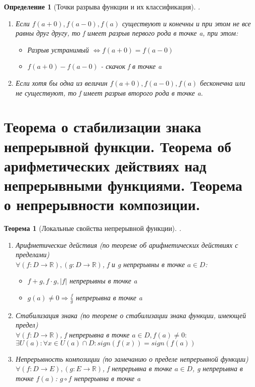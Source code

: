 \documentclass[11pt,a4paper,titlepage]{article}
\newtheorem*{theorem}{Теорема}
\newtheorem*{definition}{Определение}
\renewcommand{\implies}{\Rightarrow}
\renewcommand{\iff}{\Leftrightarrow}
\newcommand{\R}{\mathbb{R}}
\begin{document}
    \begin{definition}[Точки разрыва функции и их классификация]
        .\\
        \begin{enumerate}
            \item Если $f(a+0), f(a-0), f(a)$ существуют и конечны и при этом не все равны друг другу, то f имеет разрыв первого рода в точке a, при этом:
            \begin{itemize}
                \item Разрыв устранимый $\iff f(a+0) = f(a-0)$
                \item $f(a+0) - f(a-0)$ - скачок f в точке a
            \end{itemize}
            \item Если хотя бы одна из величин $f(a+0), f(a-0), f(a)$ бесконечна или не существуют, то f имеет разрыв второго рода в точке a.
        \end{enumerate}
    \end{definition}


    \section{Теорема о стабилизации знака непрерывной функции. Теорема об арифметических действиях над непрерывными функциями. Теорема о непрерывности композиции.}

    \begin{theorem}[Локальные свойства непрерывной функции]
        .\\
        \begin{enumerate}
            \item Арифметические действия (по теореме об арифметических действиях с пределами)\\
            $\forall (f: D \to \R), (g: D \to \R)$, f и g непрерывны в точке $a \in D$:
            \begin{itemize}
                \item $f + g, f \cdot g, |f|$ непрерывны в точке a
                \item $g(a) \neq 0 \implies \frac{f}{g}$ непрерывна в точке a
            \end{itemize}
            \item Стабилизация знака (по теореме о стабилизации знака функции, имеющей предел)\\
            $\forall (f: D \to \R)$, f непрерывна в точке $a \in D, f(a) \neq 0:$\\
            $\exists U(a): \forall x \in U(a) \cap D: sign(f(x)) = sign(f(a))$
            \item Непрерывность композиции (по замечанию о пределе непрерывной функции)\\
            $\forall (f: D \to E), (g: E \to \R)$, f непрерывна в точке $a \in D$, g непрерывна в точке $f(a)$: $g \circ f$ непрерывна в точке a
        \end{enumerate}
    \end{theorem}
\end{document}
